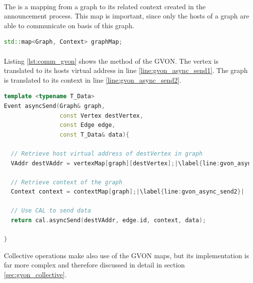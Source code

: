 \paragraph*{}
\noindent The  is a mapping from a graph to its related
context created in the announcement process.  This map is important,
since only the hosts of a graph are able to communicate on basis of
this graph.
\begin{lstlisting}[language=C++, label=lst:mapping2]
std::map<Graph, Context> graphMap;
\end{lstlisting}


\paragraph*{}
\noindent Listing \ref{lst:comm_gvon} shows the  method of the
GVON. The vertex is translated to its hosts virtual address in line
\ref{line:gvon_async_send1}. The graph is translated to its context
in line \ref{line:gvon_async_send2}.
\begin{lstlisting}[language=C++, label=lst:comm_gvon,escapechar=|]
template <typename T_Data>
Event asyncSend(Graph& graph, 
                const Vertex destVertex, 
                const Edge edge, 
                const T_Data& data){ 

  // Retrieve host virtual address of destVertex in graph
  VAddr destVAddr = vertexMap[graph][destVertex];|\label{line:gvon_async_send1}|

  // Retrieve context of the graph
  Context context = contextMap[graph];|\label{line:gvon_async_send2}|

  // Use CAL to send data
  return cal.asyncSend(destVAddr, edge.id, context, data);

}
\end{lstlisting}

\noindent Collective operations make also use of the GVON maps, but its
implementation is far more complex and therefore discussed in detail
in section \ref{sec:gvon_collective}.


